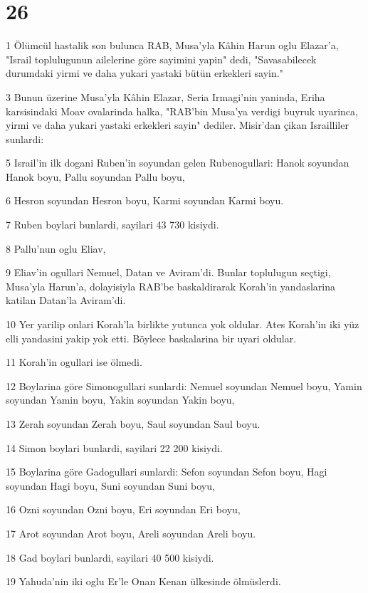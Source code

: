 \chapter{26}

\par 1 Ölümcül hastalik son bulunca RAB, Musa'yla Kâhin Harun oglu Elazar'a, "Israil toplulugunun ailelerine göre sayimini yapin" dedi, "Savasabilecek durumdaki yirmi ve daha yukari yastaki bütün erkekleri sayin."
\par 3 Bunun üzerine Musa'yla Kâhin Elazar, Seria Irmagi'nin yaninda, Eriha karsisindaki Moav ovalarinda halka, "RAB'bin Musa'ya verdigi buyruk uyarinca, yirmi ve daha yukari yastaki erkekleri sayin" dediler. Misir'dan çikan Israilliler sunlardi:
\par 5 Israil'in ilk dogani Ruben'in soyundan gelen Rubenogullari: Hanok soyundan Hanok boyu, Pallu soyundan Pallu boyu,
\par 6 Hesron soyundan Hesron boyu, Karmi soyundan Karmi boyu.
\par 7 Ruben boylari bunlardi, sayilari 43 730 kisiydi.
\par 8 Pallu'nun oglu Eliav,
\par 9 Eliav'in ogullari Nemuel, Datan ve Aviram'di. Bunlar toplulugun seçtigi, Musa'yla Harun'a, dolayisiyla RAB'be baskaldirarak Korah'in yandaslarina katilan Datan'la Aviram'di.
\par 10 Yer yarilip onlari Korah'la birlikte yutunca yok oldular. Ates Korah'in iki yüz elli yandasini yakip yok etti. Böylece baskalarina bir uyari oldular.
\par 11 Korah'in ogullari ise ölmedi.
\par 12 Boylarina göre Simonogullari sunlardi: Nemuel soyundan Nemuel boyu, Yamin soyundan Yamin boyu, Yakin soyundan Yakin boyu,
\par 13 Zerah soyundan Zerah boyu, Saul soyundan Saul boyu.
\par 14 Simon boylari bunlardi, sayilari 22 200 kisiydi.
\par 15 Boylarina göre Gadogullari sunlardi: Sefon soyundan Sefon boyu, Hagi soyundan Hagi boyu, Suni soyundan Suni boyu,
\par 16 Ozni soyundan Ozni boyu, Eri soyundan Eri boyu,
\par 17 Arot soyundan Arot boyu, Areli soyundan Areli boyu.
\par 18 Gad boylari bunlardi, sayilari 40 500 kisiydi.
\par 19 Yahuda'nin iki oglu Er'le Onan Kenan ülkesinde ölmüslerdi.
